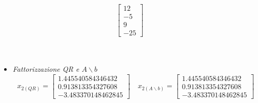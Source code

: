 \begin{enumerate}
\[\begin{bmatrix}
	      	12  \\
	      	-5  \\
	      	9   \\
	      	-25
	      \end{bmatrix}
	      \]\\\
	      \begin{itemize}
	      	\item \textit{Fattorizzazione QR e $A \backslash b$}
	      	      \[
	      	      x_{2(QR)} =\begin{bmatrix}
	      	      	1.445540584346432  \\
	      	      	0.913813354327608 \\
	      	      	-3.483370148462845
	      	      \end{bmatrix} \quad
	      	      x_{2(A \backslash b)} =\begin{bmatrix}
	      	      	1.445540584346432  \\
	      	      	0.913813354327608  \\
	      	      	-3.483370148462845
	      	      \end{bmatrix}
	      	      \]	
	      \end{itemize}
\end{enumerate}